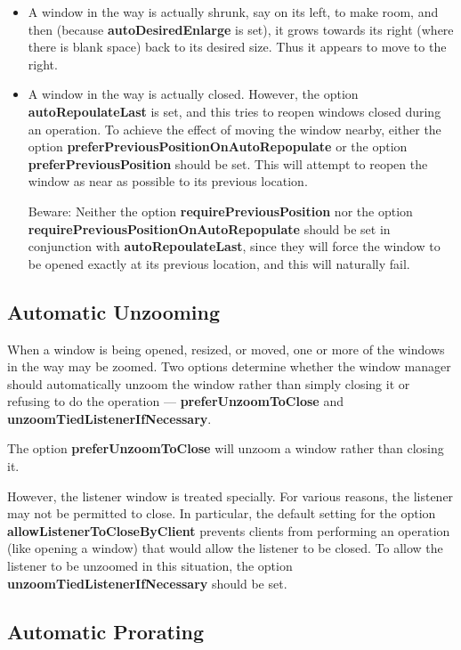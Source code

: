 \begin{itemize}
\item A window in the way is actually shrunk, say on its left, to make room,
and then (because {\bf autoDesiredEnlarge} is set), it grows towards its
right (where there is blank space) back to its desired size.  Thus it
appears to move to the right.

\item 
A window in the way is actually closed.  However, the option
{\bf autoRepoulateLast} is set, and this tries to reopen windows closed
during an operation.
To achieve the effect of moving the window nearby, either
the option
{\bf preferPreviousPositionOnAutoRepopulate} or the option
{\bf preferPreviousPosition}
should be set.
This will attempt to reopen the window as near as possible to its
previous location.

Beware: Neither the option {\bf requirePreviousPosition} nor the option
{\bf requirePreviousPositionOnAutoRepopulate} should be set in
conjunction with {\bf autoRepoulateLast},  since they will force the
window to be opened exactly at its previous location, and this will
naturally fail.

\end{itemize}

\subsection{Automatic Unzooming}

When a window is being opened, resized, or moved, one or more of the
windows in the way may be zoomed.  Two options determine whether the
window manager should automatically unzoom the window rather than simply
closing it or refusing to do the operation --- {\bf preferUnzoomToClose}
and {\bf unzoomTiedListenerIfNecessary}.

The option {\bf preferUnzoomToClose} will unzoom a window rather than
closing it.

However, the listener window is treated specially.  For various reasons, the
listener may not be permitted to close.  In particular, the default setting
for the option {\bf allowListenerToCloseByClient} prevents clients
from performing an operation (like opening a window) that would allow the
listener to be closed.  To allow the listener to be unzoomed in this
situation, the option {\bf unzoomTiedListenerIfNecessary} should be
set.

\subsection{Automatic Prorating}

